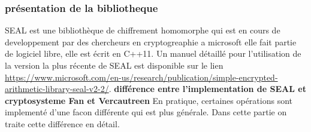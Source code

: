 \documentclass[a4paper,11pt]{report}
\begin{document}
\subsubsection*{présentation de la bibliotheque}
SEAL est une bibliothèque de chiffrement homomorphe qui est en cours de developpement par des chercheurs en cryptogreaphie a microsoft elle fait partie de logiciel libre, elle est écrit en C++11.
Un manuel détaillé pour l'utilisation de la version la plus récente de SEAL est disponible sur le lien \url{https://www.microsoft.com/en-us/research/publication/simple-encrypted-arithmetic-library-seal-v2-2/}. 
\textbf{différence entre l'implementation de SEAL et cryptosysteme Fan et Vercautreen}  \newline
En pratique, certaines opérations sont implementé d'une facon différente qui est plus générale.\newline
Dans cette partie on traite cette différence en détail.\newline
\end{document}
